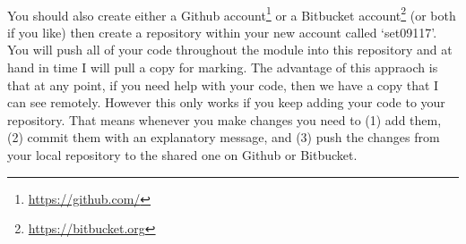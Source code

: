 \documentclass[10pt, a4paper, twosize]{article}
\begin{document}
\paragraph{} You should also create either a Github account\footnote{\url{https://github.com/}} or a Bitbucket account\footnote{\url{https://bitbucket.org}} (or both if you like) then create a repository within your new account called `set09117'. You will push all of your code throughout the module into this repository and at hand in time I will pull a copy for marking. The advantage of this appraoch is that at any point, if you need help with your code, then we have a copy that I can see remotely. However this only works if you keep adding your code to your repository. That means whenever you make changes you need to (1) add them, (2) commit them with an explanatory message,  and (3) push the changes from your local repository to the shared one on Github or Bitbucket.







\end{document}
